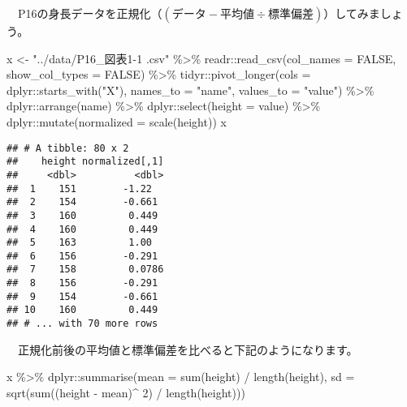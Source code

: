 \documentclass[
  12pt,
]{book}
\newenvironment{Shaded}{\begin{snugshade}}{\end{snugshade}}
\newcommand{\AttributeTok}[1]{\textcolor[rgb]{0.77,0.63,0.00}{#1}}
\newcommand{\ConstantTok}[1]{\textcolor[rgb]{0.00,0.00,0.00}{#1}}
\newcommand{\DecValTok}[1]{\textcolor[rgb]{0.00,0.00,0.81}{#1}}
\newcommand{\FunctionTok}[1]{\textcolor[rgb]{0.00,0.00,0.00}{#1}}
\newcommand{\NormalTok}[1]{#1}
\newcommand{\OtherTok}[1]{\textcolor[rgb]{0.56,0.35,0.01}{#1}}
\newcommand{\SpecialCharTok}[1]{\textcolor[rgb]{0.00,0.00,0.00}{#1}}
\newcommand{\StringTok}[1]{\textcolor[rgb]{0.31,0.60,0.02}{#1}}
\begin{document}
　P16の身長データを正規化（\((\mbox{データ} - \mbox{平均値} \div \mbox{標準偏差})\)）してみましょう。

\begin{Shaded}
\begin{Highlighting}[]
\NormalTok{x }\OtherTok{\textless{}{-}} \StringTok{"../data/P16\_図表1{-}1 .csv"} \SpecialCharTok{\%\textgreater{}\%} 
\NormalTok{  readr}\SpecialCharTok{::}\FunctionTok{read\_csv}\NormalTok{(}\AttributeTok{col\_names =} \ConstantTok{FALSE}\NormalTok{, }\AttributeTok{show\_col\_types =} \ConstantTok{FALSE}\NormalTok{) }\SpecialCharTok{\%\textgreater{}\%} 
\NormalTok{  tidyr}\SpecialCharTok{::}\FunctionTok{pivot\_longer}\NormalTok{(}\AttributeTok{cols =}\NormalTok{ dplyr}\SpecialCharTok{::}\FunctionTok{starts\_with}\NormalTok{(}\StringTok{"X"}\NormalTok{),}
                      \AttributeTok{names\_to =} \StringTok{"name"}\NormalTok{, }\AttributeTok{values\_to =} \StringTok{"value"}\NormalTok{) }\SpecialCharTok{\%\textgreater{}\%} 
\NormalTok{  dplyr}\SpecialCharTok{::}\FunctionTok{arrange}\NormalTok{(name) }\SpecialCharTok{\%\textgreater{}\%} 
\NormalTok{  dplyr}\SpecialCharTok{::}\FunctionTok{select}\NormalTok{(}\AttributeTok{height =}\NormalTok{ value) }\SpecialCharTok{\%\textgreater{}\%} 
\NormalTok{  dplyr}\SpecialCharTok{::}\FunctionTok{mutate}\NormalTok{(}\AttributeTok{normalized =} \FunctionTok{scale}\NormalTok{(height))}
\NormalTok{x}
\end{Highlighting}
\end{Shaded}

\begin{verbatim}
## # A tibble: 80 x 2
##    height normalized[,1]
##     <dbl>          <dbl>
##  1    151        -1.22  
##  2    154        -0.661 
##  3    160         0.449 
##  4    160         0.449 
##  5    163         1.00  
##  6    156        -0.291 
##  7    158         0.0786
##  8    156        -0.291 
##  9    154        -0.661 
## 10    160         0.449 
## # ... with 70 more rows
\end{verbatim}

　正規化前後の平均値と標準偏差を比べると下記のようになります。

\begin{Shaded}
\begin{Highlighting}[]
\NormalTok{x }\SpecialCharTok{\%\textgreater{}\%} 
\NormalTok{  dplyr}\SpecialCharTok{::}\FunctionTok{summarise}\NormalTok{(}\AttributeTok{mean =} \FunctionTok{sum}\NormalTok{(height) }\SpecialCharTok{/} \FunctionTok{length}\NormalTok{(height),}
                   \AttributeTok{sd =} \FunctionTok{sqrt}\NormalTok{(}\FunctionTok{sum}\NormalTok{((height }\SpecialCharTok{{-}}\NormalTok{ mean)}\SpecialCharTok{\^{}} \DecValTok{2}\NormalTok{) }\SpecialCharTok{/} \FunctionTok{length}\NormalTok{(height)))}
\end{Highlighting}
\end{Shaded}
\end{document}
